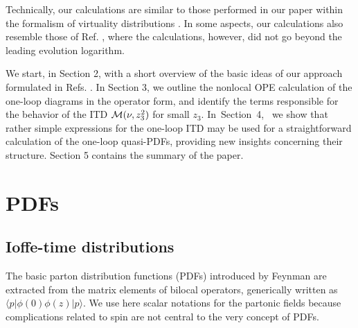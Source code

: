 \documentclass[final,5p,times,twocolumn]{elsarticle}
\begin{document}
Technically,  our calculations are similar to those
performed in our paper \cite{Radyushkin:2015gpa} within the formalism 
of virtuality distributions  \cite{Radyushkin:2014vla}.
In some aspects, our calculations  also resemble  those 
of Ref.  \cite{Balitsky:1987bk},   
where the calculations, however,  %
did not go beyond the leading evolution logarithm. %




 We start, in Section 2,  with a short  overview  of  the basic ideas of our approach formulated in Refs. 
\cite{Radyushkin:2016hsy,Radyushkin:2017cyf}. In Section 3, we  
outline the 
nonlocal OPE  %
calculation   of the one-loop diagrams
in the operator form,  and identify the terms  %
 responsible for 
the behavior of the ITD ${\cal M} (\nu, z_3^2)$ for small $z_3$. 
\mbox{In Section 4, }  we show that rather simple expressions for the one-loop 
ITD may be used for a  straightforward calculation 
of the one-loop quasi-PDFs, providing new insights concerning their 
structure.  Section 5  contains the  summary of the paper. 
 
 

 
  



  

  






 



\section{PDFs}


 
 \subsection{Ioffe-time distributions}
 


The basic parton distribution functions (PDFs)  introduced by Feynman   \cite{Feynman:1973xc}
  are  extracted from  the 
matrix elements of bilocal operators, 
generically  written as   $\langle  p | \phi (0)  \phi(z)  | p \rangle $.
We use here scalar notations 
for the partonic  fields because 
 complications related to spin are not central to the very concept of PDFs. 
 
\end{document}
